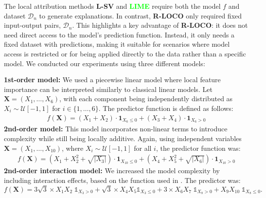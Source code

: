\documentclass{article}
\newcommand\X{\boldsymbol{X}}
\theoremstyle{plain}
\theoremstyle{definition}
\theoremstyle{remark}
\newcommand{\ours}{\textcolor{ours}{\textbf{R-LOCO}}}
\newcommand{\lsv}{\textcolor{lsv}{\textbf{L-SV}}}
\newcommand{\lime}{\textcolor{lime}{\textbf{LIME}}}
\begin{document}
The local attribution methods \lsv{} and \lime{} require both the model $f$ and dataset $\mathcal{D}_n$ to generate explanations. In contrast, \ours{} only required fixed input-output pairs, $\mathcal{D}_n$. This highlights a key advantage of \ours{}: it does not need direct access to the model's prediction function. Instead, it only needs a fixed dataset with predictions, making it suitable for scenarios where model access is restricted or for being applied directly to the data rather than a specific model. We conducted our experiments using three different models:

\textbf{1st-order model:} We used a piecewise linear model where local feature importance can be interpreted similarly to classical linear models. Let $\X = (X_1, \dots, X_{6})$, with each component being independently distributed as $X_i \sim \mathcal{U}[-1, 1]$ for $i \in \{1, \dots, 6\}$. The predictor function is defined as follows:
\begin{align} 
    f(\X) = (X_1 + X_2) \cdot \mathbf{1}_{X_6 \leq 0} + (X_3 + X_4) \cdot \mathbf{1}_{X_6 > 0}
\end{align}\label{model:1st-order_eq}
\textbf{2nd-order model:}
This model incorporates non-linear terms to introduce complexity while still being locally additive. Again, using independent variables $\X = (X_1, \dots, X_{10})$, where $X_i \sim \mathcal{U}[-1, 1]$ for all $i$, the predictor function was:
\begin{align*}
    f(\X) = (X_1 + X_2^2 + \sqrt{|X_3|}) \cdot \mathbf{1}_{X_{10} \leq 0} + (X_4 + X_5^2 + \sqrt{|X_6|}) \cdot \mathbf{1}_{X_{10} > 0}
\end{align*}
\textbf{2nd-order interaction model:}
We increased the model complexity by including interaction effects, based on the function used in \citep{benard2021shaff}. The predictor was:
\begin{equation*}
f(\X)  = 3\sqrt{3} \times X_1 X_2 \; \mathds{1}_{X_3 > 0} + \sqrt{3} \times X_4  X_5 \mathds{1}_{X_3 \leq 0}  + 3 \times X_6  X_7 \; \mathds{1}_{X_8 > 0} +  X_9  X_{10} \; \mathds{1}_{X_8 \leq 0}.
\end{equation*}
\end{document}
